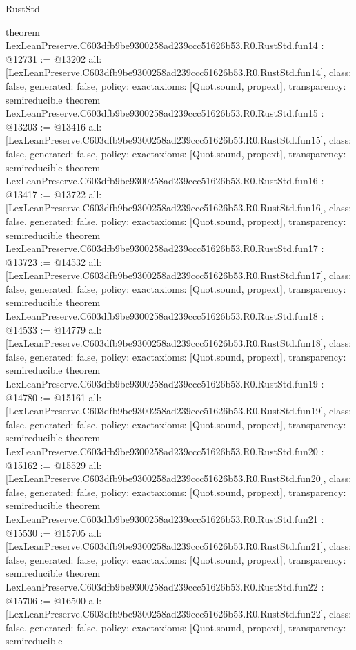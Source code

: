 \begin{lexlean}{RustStd}
\begin{coremodule}
{}
theorem LexLeanPreserve.C603dfb9be9300258ad239ccc51626b53.R0.RustStd.fun14 : @12731 := @13202 {
  all: [LexLeanPreserve.C603dfb9be9300258ad239ccc51626b53.R0.RustStd.fun14],
  class: false,
  generated: false,
  policy: exact{axioms: [Quot.sound, propext]},
  transparency: semireducible
}
theorem LexLeanPreserve.C603dfb9be9300258ad239ccc51626b53.R0.RustStd.fun15 : @13203 := @13416 {
  all: [LexLeanPreserve.C603dfb9be9300258ad239ccc51626b53.R0.RustStd.fun15],
  class: false,
  generated: false,
  policy: exact{axioms: [Quot.sound, propext]},
  transparency: semireducible
}
theorem LexLeanPreserve.C603dfb9be9300258ad239ccc51626b53.R0.RustStd.fun16 : @13417 := @13722 {
  all: [LexLeanPreserve.C603dfb9be9300258ad239ccc51626b53.R0.RustStd.fun16],
  class: false,
  generated: false,
  policy: exact{axioms: [Quot.sound, propext]},
  transparency: semireducible
}
theorem LexLeanPreserve.C603dfb9be9300258ad239ccc51626b53.R0.RustStd.fun17 : @13723 := @14532 {
  all: [LexLeanPreserve.C603dfb9be9300258ad239ccc51626b53.R0.RustStd.fun17],
  class: false,
  generated: false,
  policy: exact{axioms: [Quot.sound, propext]},
  transparency: semireducible
}
theorem LexLeanPreserve.C603dfb9be9300258ad239ccc51626b53.R0.RustStd.fun18 : @14533 := @14779 {
  all: [LexLeanPreserve.C603dfb9be9300258ad239ccc51626b53.R0.RustStd.fun18],
  class: false,
  generated: false,
  policy: exact{axioms: [Quot.sound, propext]},
  transparency: semireducible
}
theorem LexLeanPreserve.C603dfb9be9300258ad239ccc51626b53.R0.RustStd.fun19 : @14780 := @15161 {
  all: [LexLeanPreserve.C603dfb9be9300258ad239ccc51626b53.R0.RustStd.fun19],
  class: false,
  generated: false,
  policy: exact{axioms: [Quot.sound, propext]},
  transparency: semireducible
}
theorem LexLeanPreserve.C603dfb9be9300258ad239ccc51626b53.R0.RustStd.fun20 : @15162 := @15529 {
  all: [LexLeanPreserve.C603dfb9be9300258ad239ccc51626b53.R0.RustStd.fun20],
  class: false,
  generated: false,
  policy: exact{axioms: [Quot.sound, propext]},
  transparency: semireducible
}
theorem LexLeanPreserve.C603dfb9be9300258ad239ccc51626b53.R0.RustStd.fun21 : @15530 := @15705 {
  all: [LexLeanPreserve.C603dfb9be9300258ad239ccc51626b53.R0.RustStd.fun21],
  class: false,
  generated: false,
  policy: exact{axioms: [Quot.sound, propext]},
  transparency: semireducible
}
theorem LexLeanPreserve.C603dfb9be9300258ad239ccc51626b53.R0.RustStd.fun22 : @15706 := @16500 {
  all: [LexLeanPreserve.C603dfb9be9300258ad239ccc51626b53.R0.RustStd.fun22],
  class: false,
  generated: false,
  policy: exact{axioms: [Quot.sound, propext]},
  transparency: semireducible
}
\end{coremodule}
\end{lexlean}
